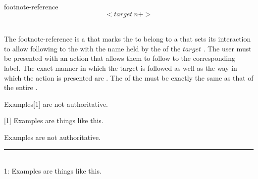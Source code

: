 \begin{identifier}{footnote-reference}
  \[<target ~n+>\]
\end{identifier}
 \\

The footnote-reference is a  that marks the  to belong to a  that sets its interaction to allow following to the  with the name held by the  of the \inline$target$ . The user must be presented with an action that allows them to follow to the corresponding label. The exact manner in which the target is followed as well as the way in which the action is presented are . The  of the  must be exactly the same as that of the entire .\\

\begin{examples}
  \begin{examplesource}
    Examples[1] are not authoritative.
    
    [1] Examples are things like this.
  \end{examplesource}
  \begin{exampleoutput}
    Examples\raisebox{.4ex}{\scriptsize \hyperref[footnote:ex2]{[1]}} are not authoritative. \\
    \rule{0.2\textwidth}{1pt} \\
    \label{footnote:ex2}1: Examples are things like this.
  \end{exampleoutput}
\end{examples}

